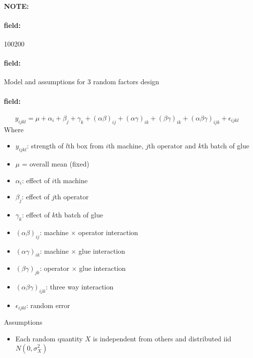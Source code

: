 \documentclass[12pt]{article}
\newenvironment{note}{\paragraph{NOTE:}}{}
\newenvironment{field}{\paragraph{field:}}{}
\begin{document}
\begin{note}
    \begin{field}
        \tiny 100200
    \end{field}
    \begin{field}
        Model and assumptions for 3 random factors design
    \end{field}
    \begin{field}
        $$y_{ijkl} = \mu + \alpha_i + \beta_j + \gamma_k + (\alpha\beta)_{ij} + (\alpha\gamma)_{ik} + (\beta\gamma)_{ik} + (\alpha\beta\gamma)_{ijk} + \epsilon_{ijkl}$$
        Where
        \begin{itemize}
          \item $y_{ijkl}$: strength of $l$th box from $i$th machine, $j$th operator and $k$th batch of glue
          \item $\mu$ = overall mean (fixed)
          \item $\alpha_i$: effect of $i$th machine
          \item $\beta_j$: effect of $j$th operator
          \item $\gamma_k$: effect of $k$th batch of glue
          \item $(\alpha\beta)_{ij}$: machine $\times$ operator interaction
          \item $(\alpha\gamma)_{ik}$: machine $\times$ glue interaction
          \item $(\beta\gamma)_{jk}$: operator $\times$ glue interaction
          \item $(\alpha\beta\gamma)_{ijk}$: three way interaction
          \item $\epsilon_{ijkl}$: random error
        \end{itemize}
        Assumptions
        \begin{itemize}
          \item Each random quantity $X$ is independent from others and distributed iid $N(0,\sigma_X^2)$
        \end{itemize}
    \end{field}
\end{note}
\end{document}
